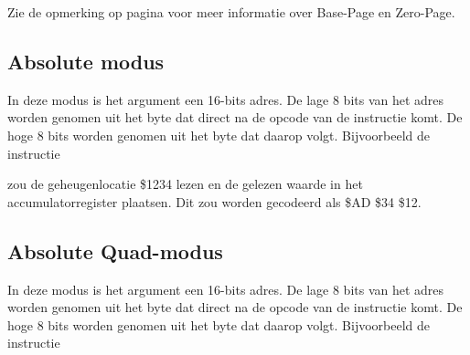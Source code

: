 Zie de opmerking op pagina \pageref{Base-Page (Zero-Page) Mode} voor meer informatie over Base-Page en Zero-Page.
\fi

\subsection{Absolute modus}

In deze modus is het argument een 16-bits adres. De lage 8 bits van het adres worden genomen uit het byte dat direct na de opcode van de instructie komt. De hoge 8 bits worden genomen uit het byte dat daarop volgt. Bijvoorbeeld de instructie


zou de geheugenlocatie \$1234 lezen en de gelezen waarde in het accumulatorregister plaatsen. Dit zou worden gecodeerd als \$AD \$34 \$12.

\subsection{Absolute Quad-modus}

In deze modus is het argument een 16-bits adres. De lage 8 bits van het adres worden genomen uit het byte dat direct na de opcode van de instructie komt. De hoge 8 bits worden genomen uit het byte dat daarop volgt. Bijvoorbeeld de instructie

